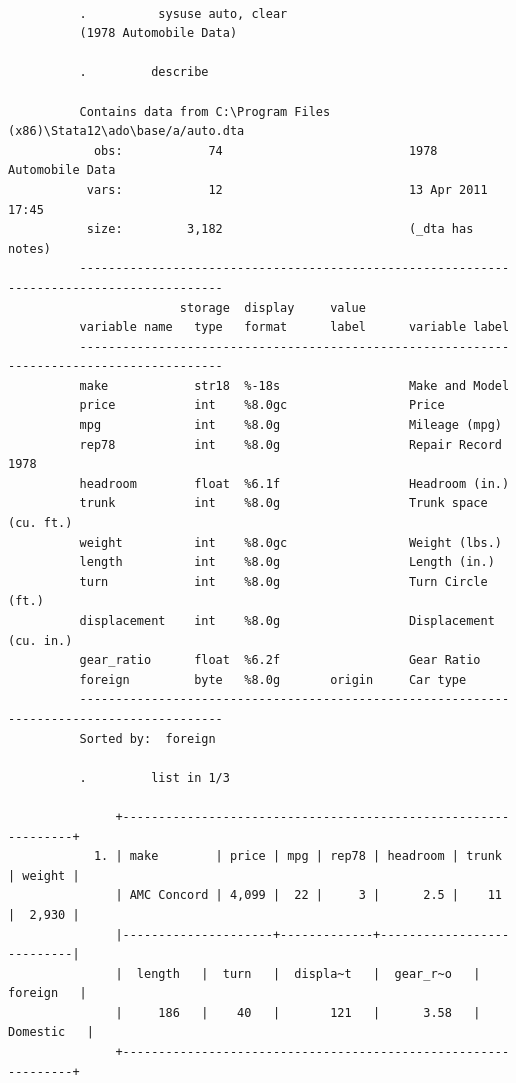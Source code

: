 \documentclass{article}
\begin{document}
\begin{verbatim}
          
          .          sysuse auto, clear      
          (1978 Automobile Data)
          
          .         describe
          
          Contains data from C:\Program Files (x86)\Stata12\ado\base/a/auto.dta
            obs:            74                          1978 Automobile Data
           vars:            12                          13 Apr 2011 17:45
           size:         3,182                          (_dta has notes)
          ------------------------------------------------------------------------------------------
                        storage  display     value
          variable name   type   format      label      variable label
          ------------------------------------------------------------------------------------------
          make            str18  %-18s                  Make and Model
          price           int    %8.0gc                 Price
          mpg             int    %8.0g                  Mileage (mpg)
          rep78           int    %8.0g                  Repair Record 1978
          headroom        float  %6.1f                  Headroom (in.)
          trunk           int    %8.0g                  Trunk space (cu. ft.)
          weight          int    %8.0gc                 Weight (lbs.)
          length          int    %8.0g                  Length (in.)
          turn            int    %8.0g                  Turn Circle (ft.)
          displacement    int    %8.0g                  Displacement (cu. in.)
          gear_ratio      float  %6.2f                  Gear Ratio
          foreign         byte   %8.0g       origin     Car type
          ------------------------------------------------------------------------------------------
          Sorted by:  foreign
          
          .         list in 1/3
          
               +---------------------------------------------------------------+
            1. | make        | price | mpg | rep78 | headroom | trunk | weight |
               | AMC Concord | 4,099 |  22 |     3 |      2.5 |    11 |  2,930 |
               |---------------------+-------------+---------------------------|
               |  length   |  turn   |  displa~t   |  gear_r~o   |   foreign   |
               |     186   |    40   |       121   |      3.58   |  Domestic   |
               +---------------------------------------------------------------+
          

\end{verbatim}
\end{document}
